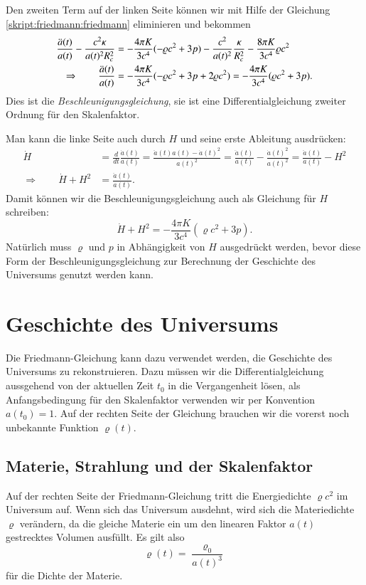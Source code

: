 Den zweiten Term auf der linken Seite können wir mit Hilfe der Gleichung
\eqref{skript:friedmann:friedmann}
eliminieren und bekommen
\begin{align}
\frac{\ddot a(t)}{a(t)}
-
\frac{c^2\kappa }{a(t)^2R_c^2}
&=
-\frac{4\pi K}{3c^4}(-\varrho c^2 + 3p)
-\frac{c^2}{a(t)^2}\frac{\kappa }{R_c^2}
-\frac{8\pi K}{3c^4}\varrho c^2
\notag
\\
\Rightarrow\qquad
\frac{\ddot a(t)}{a(t)}
&=
-\frac{4\pi K}{3c^4}(-\varrho c^2 + 3p + 2 \varrho c^2)
=
-\frac{4\pi K}{3c^4}(\varrho c^2 + 3p).
\label{skript:friedmann:beschleunigung}
\end{align}
Dies ist die {\em Beschleunigungsgleichung}, sie ist eine
Differentialgleichung zweiter Ordnung für den Skalenfaktor.
%

Man kann die linke Seite auch durch $H$ und seine erste Ableitung
ausdrücken:
\begin{align*}
\dot H
&=
\frac{d}{dt}\frac{\dot a(t)}{a(t)}
=
\frac{\ddot a(t) a(t)-\dot a(t)^2}{a(t)^2}
=
\frac{\ddot a(t)}{a(t)} - \frac{\dot a(t)^2}{a(t)^2}
=
\frac{\ddot a(t)}{a(t)} - H^2
\\
\Rightarrow
\qquad
\dot H+H^2
&=
\frac{\ddot a(t)}{a(t)}.
\end{align*}
Damit können wir die Beschleunigungsgleichung auch als Gleichung
für $H$ schreiben:
\begin{equation}
\dot H+H^2
=
-\frac{4\pi K}{3c^4}(\varrho c^2 + 3p).
\end{equation}
Natürlich muss $\varrho$ und $p$ in Abhängigkeit von $H$ ausgedrückt
werden, bevor diese Form der Beschleunigungsgleichung zur Berechnung
der Geschichte des Universums genutzt werden kann.

\section{Geschichte des Universums}
Die Friedmann-Gleichung kann dazu verwendet werden, die Geschichte
des Universums zu rekonstruieren.
Dazu müssen wir die Differentialgleichung aussgehend von der
aktuellen Zeit $t_0$ in die Vergangenheit lösen, als Anfangsbedingung für den
Skalenfaktor verwenden wir per Konvention $a(t_0)=1$.
Auf der rechten Seite der Gleichung brauchen wir die vorerst noch
unbekannte Funktion $\varrho(t)$.

\subsection{Materie, Strahlung und der Skalenfaktor}
Auf der rechten Seite der Friedmann-Gleichung tritt die Energiedichte
$\varrho c^2$ im Universum auf.
Wenn sich das Universum ausdehnt, wird sich die Materiedichte $\varrho$
verändern, da die gleiche Materie ein um den linearen Faktor
$a(t)$ gestrecktes Volumen ausfüllt.
Es gilt also 
\begin{equation}
\varrho(t) = \frac{\varrho_0}{a(t)^3}
\label{skript:friedmann:zustandmaterie}
\end{equation}
für die Dichte der Materie.

